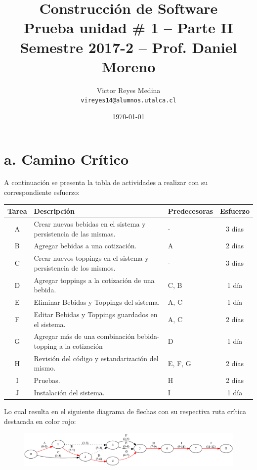 \documentclass[11pt]{utalcaDoc}
\title{{\bf \Large Construcción de Software \\ 
			Prueba unidad \# 1 -- Parte II}\\ 
			{\normalsize Semestre 2017-2 -- Prof. Daniel Moreno}}
\author{
  Victor Reyes Medina\\
  \texttt{vireyes14@alumnos.utalca.cl}
}
\date{\today}
\begin{document}
\renewcommand{\figurename}{Figura~}
\renewcommand{\tablename}{Tabla~}
\renewcommand{\lstlistingname}{Código~}
\renewcommand{\theenumii}{\arabic{enumii}}
\renewcommand{\labelenumii}{%
  \theenumii.
}
\maketitle


\section*{a. Camino Crítico}
A continuación se presenta la tabla de actividades a realizar con su correspondiente esfuerzo:

\begin{tabular}{|c|p{9.5cm}|p{3cm} |c|}
\hline 
\textbf{Tarea} & \textbf{Descripción} & \textbf{Predecesoras} & \textbf{Esfuerzo}\\ 
\hline 
A & Crear nuevas bebidas en el sistema y persistencia de las mismas. & - & 3 días  \\ 
\hline 
B & Agregar bebidas a una cotización. & A & 2 días \\ 
\hline 
C & Crear nuevos toppings en el sistema y persistencia de los mismos. & - & 3 días  \\ 
\hline 
D & Agregar toppings a la cotización de una bebida. & C, B & 1 día  \\ 
\hline 
E & Eliminar Bebidas y Toppings del sistema. & A, C & 1 día  \\ 
\hline 
F & Editar Bebidas y Toppings guardados en el sistema. & A, C & 2 días  \\ 
\hline 
G & Agregar más de una combinación bebida-topping a la cotización & D & 1 día  \\ 
\hline 
H & Revisión del código y estandarización del mismo. & E, F, G & 2 días  \\ 
\hline 
I & Pruebas. & H & 2 días  \\ 
\hline
J & Instalación del sistema. & I & 1 día  \\ 
\hline

\end{tabular} 

Lo cual resulta en el siguiente diagrama de flechas con su respectiva ruta crítica destacada en color rojo:

\begin{figure}[H]
\includegraphics[scale=0.45]{arrows.png}
\end{figure}
\end{document}
